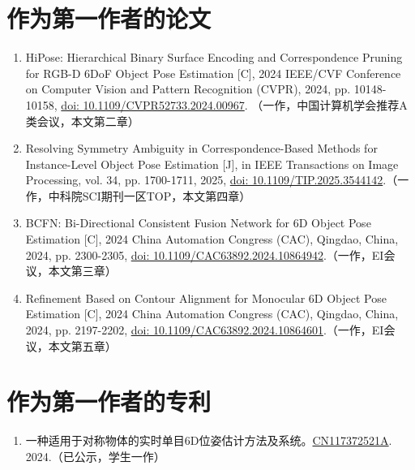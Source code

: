 \cleardoublepage
{}

\section*{作为第一作者的论文}

\begin{sloppypar}  %

\begin{enumerate}
    \item HiPose: Hierarchical Binary Surface Encoding and Correspondence Pruning for RGB-D 6DoF Object Pose Estimation [C], 2024 IEEE/CVF Conference on Computer Vision and Pattern Recognition (CVPR), 2024, pp. 10148-10158, \href{https://doi.org/10.1109/CVPR52733.2024.00967}{doi: 10.1109/CVPR52733.2024.00967}. （一作，中国计算机学会推荐A类会议，本文第二章）
    \item Resolving Symmetry Ambiguity in Correspondence-Based Methods for Instance-Level Object Pose Estimation [J], in IEEE Transactions on Image Processing, vol. 34, pp. 1700-1711, 2025, \href{https://doi.org/10.1109/TIP.2025.3544142}{doi: 10.1109/TIP.2025.3544142}.（一作，中科院SCI期刊一区TOP，本文第四章）
    \item BCFN: Bi-Directional Consistent Fusion Network for 6D Object Pose Estimation [C], 2024 China Automation Congress (CAC), Qingdao, China, 2024, pp. 2300-2305, \href{https://doi.org/10.1109/CAC63892.2024.10864942}{doi: 10.1109/CAC63892.2024.10864942}.（一作，EI会议，本文第三章）
    \item Refinement Based on Contour Alignment for Monocular 6D Object Pose Estimation [C], 2024 China Automation Congress (CAC), Qingdao, China, 2024, pp. 2197-2202, \href{https://doi.org/10.1109/CAC63892.2024.10864601}{doi: 10.1109/CAC63892.2024.10864601}.（一作，EI会议，本文第五章）
\end{enumerate}

\section*{作为第一作者的专利}
\begin{enumerate}
    \item 一种适用于对称物体的实时单目6D位姿估计方法及系统。\href{https://patents.google.com/patent/CN117372521A}{CN117372521A}. 2024.（已公示，学生一作）
\end{enumerate}


\end{sloppypar}
